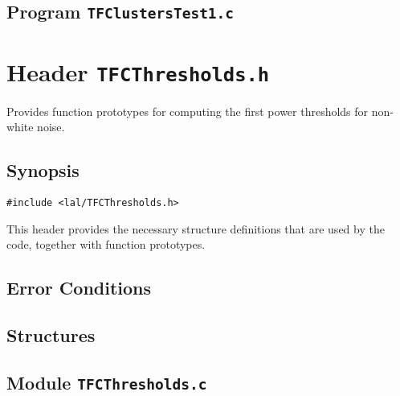 \newpage
\subsection{Program \texttt{TFClustersTest1.c}}



\newpage
\section{Header \texttt{TFCThresholds.h}}
\label{s:TFCThresholds.h}

\noindent Provides function prototypes for computing the first power thresholds for non-white noise.

\subsection*{Synopsis}
\begin{verbatim}
#include <lal/TFCThresholds.h>
\end{verbatim}

\noindent This header provides the necessary structure definitions that are used by the code, together with function prototypes.


\subsection*{Error Conditions}


\newpage
\subsection*{Structures}


\newpage
\subsection{Module \texttt{TFCThresholds.c}}
\label{ss:TFCThresholds.c} 


